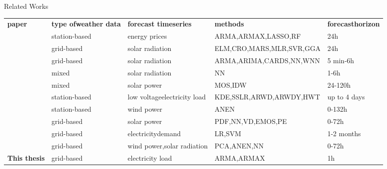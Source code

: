 \documentclass[t,xcolor={table},fleqn]{beamer}
\newcommand{\tcite}{\Textcite}
\begin{document}
\begin{frame}{Related Works}

\begin{table}[!ht]%
\centering
\scriptsize
\begin{tabularx}{\linewidth}{p{22mm}XXXX}
\textbf{paper} & \textbf{type of\newline weather data} & \textbf{forecast time\newline series} & \textbf{methods} & \textbf{forecast\newline horizon}\\\Xhline{2\arrayrulewidth}
\tcite{Ludwig2015} & station-based & energy prices & ARMA,ARMAX,\newline LASSO,RF & 24h\\
\tcite{Salcedo-Sanz2018} & grid-based & solar radiation & ELM,CRO,MARS,\newline MLR,SVR,GGA & 24h\\
\tcite{Diagne2013} & grid-based & solar radiation & ARMA,ARIMA,\newline CARDS,NN,WNN & 5 min-6h\\\Xhline{2\arrayrulewidth}
\tcite{Aguiar2016} & mixed & solar radiation & NN & 1-6h\\
\tcite{Bofinger2006} & mixed & solar power & MOS,IDW & 24-120h\\
\tcite{Haben2018} & station-based & low voltage\newline electricity load & KDE,SSLR,ARWD,\newline ARWDY,HWT & up to 4 days\\
\tcite{Alessandrini2015} & station-based & wind power & ANEN & 0-132h\\\Xhline{2\arrayrulewidth}
\tcite{Sperati2016} & grid-based & solar power & PDF,NN,VD,\newline EMOS,PE & 0-72h\\
\tcite{DeFelice2015} & grid-based & electricity\newline demand & LR,SVM & 1-2 months\\
\tcite{Davo2016} & grid-based & wind power,\newline solar radiation & PCA,ANEN,NN & 0-72h\\\Xhline{2\arrayrulewidth}
\textbf{This thesis} & grid-based & electricity load & ARMA,ARMAX & 1h\\
\end{tabularx}
\label{tab:relwork}
\end{table}

\end{frame}
\end{document}
